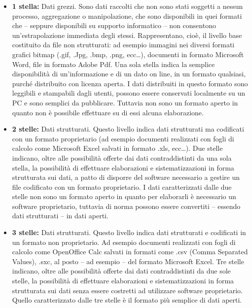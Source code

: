 \documentclass{article}
\theoremstyle{plain}
\theoremstyle{definition}
\begin{document}
\begin{itemize}
\item \textbf{1 stella:} Dati grezzi. Sono dati raccolti che non sono stati soggetti a nessun processo, aggregazione o manipolazione, che sono disponibili in quei formati che – seppure disponibili su supporto informatico – non consentono un'estrapolazione immediata degli stessi. Rappresentano, cioè, il livello base costituito da file non strutturati: ad esempio immagini nei diversi formati grafici bitmap (.gif, .Jpg, .bmp, .png, ecc…), documenti in formato Microsoft Word, file in formato Adobe Pdf. Una sola stella indica la semplice disponibilità di un'informazione e di un dato on line, in un formato qualsiasi, purché distribuito con licenza aperta. I dati distribuiti in questo formato sono leggibili e stampabili dagli utenti, possono essere conservati localmente su un PC e sono semplici da pubblicare. Tuttavia non sono un formato aperto in quanto non è possibile effettuare su di essi alcuna elaborazione.

\item \textbf{2 stelle:} Dati strutturati. Questo livello indica dati strutturati ma codificati con un formato proprietario (ad esempio documenti realizzati con fogli di calcolo come Microsoft Excel salvati in formato .xls, ecc…). Due stelle indicano, oltre alle possibilità offerte dai dati contraddistinti da una sola stella, la possibilità di effettuare elaborazioni e sistematizzazioni in forma strutturata sui dati, a patto di disporre del software necessario a gestire un file codificato con un formato proprietario. I dati caratterizzati dalle due stelle non sono un formato aperto in quanto per elaborarli è necessario un software proprietario, tuttavia di norma possono essere convertiti – essendo dati strutturati – in dati aperti.

\item \textbf{3 stelle:} Dati strutturati. Questo livello indica dati strutturati e codificati in un formato non proprietario. Ad esempio documenti realizzati con fogli di calcolo come OpenOffice Calc salvati in formati come .csv (Comma Separated Values), .sxc, al posto – ad esempio – del formato Microsoft Excel. Tre stelle indicano, oltre alle possibilità offerte dai dati contraddistinti da due sole stelle, la possibilità di effettuare elaborazioni e sistematizzazioni in forma strutturata sui dati senza essere costretti ad utilizzare software proprietario. Quello caratterizzato dalle tre stelle è il formato più semplice di dati aperti.


\end{itemize}
\end{document}
